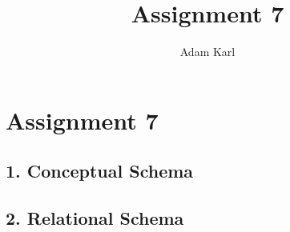 \documentclass[a4paper]{article}
\title{Assignment 7}
\author{Adam Karl}
\begin{document}
\maketitle

\section{Assignment 7}
\subsection{1. Conceptual Schema}

\subsection{2. Relational Schema}
\end{document}
